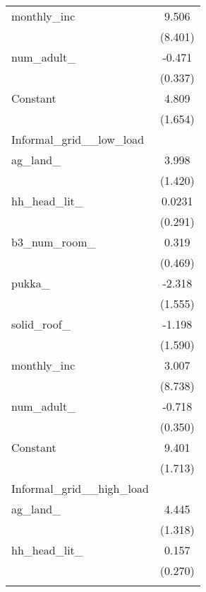 {\begin{tabular}{l*{1}{c}}
\addlinespace
monthly\_inc         &       9.506         \\
                    &     (8.401)         \\
\addlinespace
num\_adult\_          &      -0.471         \\
                    &     (0.337)         \\
\addlinespace
Constant            &       4.809\sym{***}\\
                    &     (1.654)         \\
\midrule
Informal\_grid\_\_low\_load&                     \\
ag\_land\_            &       3.998\sym{***}\\
                    &     (1.420)         \\
\addlinespace
hh\_head\_lit\_        &      0.0231         \\
                    &     (0.291)         \\
\addlinespace
b3\_num\_room\_        &       0.319         \\
                    &     (0.469)         \\
\addlinespace
pukka\_              &      -2.318         \\
                    &     (1.555)         \\
\addlinespace
solid\_roof\_         &      -1.198         \\
                    &     (1.590)         \\
\addlinespace
monthly\_inc         &       3.007         \\
                    &     (8.738)         \\
\addlinespace
num\_adult\_          &      -0.718\sym{**} \\
                    &     (0.350)         \\
\addlinespace
Constant            &       9.401\sym{***}\\
                    &     (1.713)         \\
\midrule
Informal\_grid\_\_high\_load&                     \\
ag\_land\_            &       4.445\sym{***}\\
                    &     (1.318)         \\
\addlinespace
hh\_head\_lit\_        &       0.157         \\
                    &     (0.270)         \\
\addlinespace

\end{tabular}}
